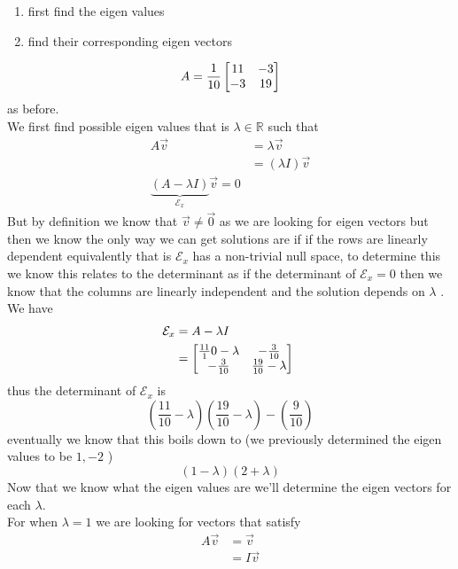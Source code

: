 \documentclass[11pt]{book}
\begin{document}
\begin{enumerate}
    \item first find the eigen values 
    \item find their corresponding eigen vectors 
\end{enumerate}

\begin{eg}
    \[
    A= \frac{1}{10}\mat[b]{ 11 & -3 \\ -3 & 19 }
    \]
    as before.\\
    We first find possible eigen values that is $\lambda \in \mathbb{R} $ such that 
    \begin{align*}
        A\vec{v} &= \lambda \vec{v}   \\ 
                 &= \left( \lambda I \right) \vec{v}   \\ 
         \underbrace{\left( A - \lambda I \right)  }_{\mathcal{E} _{x} }\vec{v}  = 0
    \end{align*}
    But by definition we know that $\vec{v} \neq \vec{0} $ as we are looking for eigen vectors but then we know the only way we can get solutions are if if the rows are linearly dependent equivalently that is $\mathcal{E} _{x} $ has a non-trivial null space, to determine this we know this relates to the determinant as if the determinant of $\mathcal{E} _{x} = 0$ then we know that the columns are linearly independent and the solution depends on $\lambda $ .\\
    We have 
    \begin{align*}
        \mathcal{E} _{x} &= A - \lambda I  \\ 
        &= \mat[b]{ \frac{11}{1}0 - \lambda  & -\frac{3}{10} \\ -\frac{3}{10} & \frac{19}{10} - \lambda  }  \ 
    \end{align*}
    thus the determinant of $\mathcal{E} _{x} $ is 
    \[
        \left( \frac{11}{10} - \lambda  \right) \left( \frac{19}{10} - \lambda  \right)  - \left( \frac{9}{10} \right) 
    \]
    eventually we know that this boils down to (we previously determined the eigen values to be $1,-2$ )
    \[
        \left( 1 - \lambda  \right) \left( 2 + \lambda  \right) 
    \]
    Now that we know what the eigen values are we'll determine the eigen vectors for each $\lambda $. \\
    For when $\lambda = 1$ we are looking for vectors that satisfy
    \begin{align*}
        A\vec{v} &= \vec{v}   \\ 
        &= I \vec{v}   \\ 

\end{align*}
\end{eg}
\end{document}
